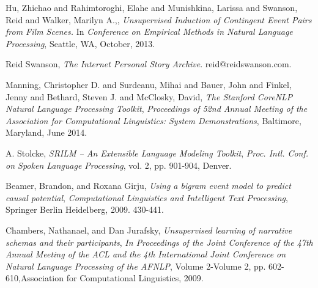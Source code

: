 \documentclass[10pt,english]{article}
\begin{document}
 \begin{thebibliography}{}

	Hu, Zhichao and Rahimtoroghi, Elahe and Munishkina, Larissa and Swanson, Reid and Walker, Marilyn A.,,
	\emph{Unsupervised Induction of Contingent Event Pairs from Film Scenes.}
	In \textit{Conference on Empirical Methods in Natural Language Processing},
	Seattle, WA, October, 2013.

  Reid Swanson,
  \emph{The Internet Personal Story Archive}.
  reid@reidswanson.com.
  
	Manning, Christopher D. and  Surdeanu, Mihai  and  Bauer, John  and  Finkel, Jenny  and  Bethard, Steven J. and  McClosky, David,
	\emph{The {Stanford} {CoreNLP} Natural Language Processing Toolkit},
	\textit{Proceedings of 52nd Annual Meeting of the Association for Computational Linguistics: System Demonstrations},
	Baltimore, Maryland, June 2014.

	A. Stolcke,
	\emph{SRILM -- An Extensible Language Modeling Toolkit},
	\textit{Proc. Intl. Conf. on Spoken Language Processing},
	vol. 2, pp. 901-904, Denver.

	Beamer, Brandon, and Roxana Girju,
	 \emph{Using a bigram event model to predict causal potential},
	  \textit{Computational Linguistics and Intelligent Text Processing},
	   Springer Berlin Heidelberg, 2009. 430-441.

	Chambers, Nathanael, and Dan Jurafsky,
	\emph{Unsupervised learning of narrative schemas and their participants},
	 \textit{In Proceedings of the Joint Conference of the 47th Annual Meeting of the ACL and the 4th International Joint Conference on Natural Language Processing of the AFNLP},
	  Volume 2-Volume 2, pp. 602-610,Association for Computational Linguistics, 2009.

  

  


\end{thebibliography}
\end{document}
